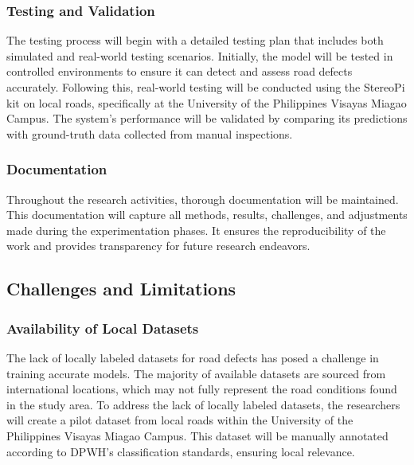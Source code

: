 \subsubsection{Testing and Validation}
The testing process will begin with a detailed testing plan that includes both simulated and real-world testing scenarios. Initially, the model will be tested in controlled environments to ensure it can detect and assess road defects accurately. Following this, real-world testing will be conducted using the StereoPi kit on local roads, specifically at the University of the Philippines Visayas Miagao Campus. The system's performance will be validated by comparing its predictions with ground-truth data collected from manual inspections. 

\subsubsection{Documentation}
Throughout the research activities, thorough documentation will be maintained. This documentation will capture all methods, results, challenges, and adjustments made during the experimentation phases. It ensures the reproducibility of the work and provides transparency for future research endeavors. 

\subsection{\textbf{Challenges and Limitations} }
\subsubsection{Availability of Local Datasets}
The lack of locally labeled datasets for road defects has posed a challenge in training accurate models. The majority of available datasets are sourced from international locations, which may not fully represent the road conditions found in the study area. To address the lack of locally labeled datasets, the researchers will create a pilot dataset from local roads within the University of the Philippines Visayas Miagao Campus. This dataset will be manually annotated according to DPWH's classification standards, ensuring local relevance.

